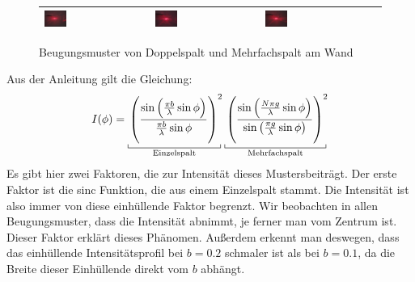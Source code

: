 \begin{figure}[H]
\begin{tabular}{llll}
					\includegraphics[width=0.22\textwidth]{images/tv5/mehrfachspalt/n_3.jpg} &
					\includegraphics[width=0.22\textwidth]{images/tv5/mehrfachspalt/n_4.jpg} &
					\includegraphics[width=0.22\textwidth]{images/tv5/mehrfachspalt/n_5.jpg} \\
				\bottomrule
			\end{tabular}
		\caption{\centering Beugungsmuster von Doppelspalt und Mehrfachspalt am Wand}
		\vspace{-1em}
		\end{figure}
		Aus der Anleitung gilt die Gleichung:
		\begin{align}
			I(\phi) = 
				\brc{\left(\frac{\sin\left(\frac{\pi b}{\lambda} \sin\phi\right)}{\frac{\pi b}{\lambda} \sin\phi}\right)^2}{\text{Einzelspalt}}
				\brc{\left(\frac{\sin\left(\frac{N\pi g}{\lambda} \sin\phi\right)}{\sin\left(\frac{\pi g}{\lambda} \sin\phi\right)}\right)^2}{\text{Mehrfachspalt}}
		\end{align}
		Es gibt hier zwei Faktoren, die zur Intensität dieses Mustersbeiträgt. Der erste Faktor ist die sinc Funktion, die aus einem Einzelspalt stammt. Die Intensität ist also immer von diese einhüllende Faktor begrenzt. Wir beobachten in allen Beugungsmuster, dass die Intensität abnimmt, je ferner man vom Zentrum ist. Dieser Faktor erklärt dieses Phänomen. Außerdem erkennt man deswegen, dass das einhüllende Intensitätsprofil bei $b = \num{0.2}$ schmaler ist als bei $b = \num{0.1}$, da die Breite dieser Einhüllende direkt vom $b$ abhängt. 

